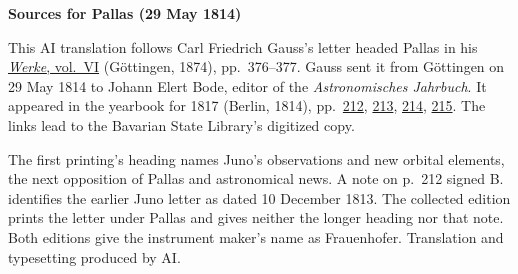 \clearpage\thispagestyle{empty}
\begin{center}\textbf{Sources for Pallas (29 May 1814)}\end{center}
\noindent This AI translation follows Carl Friedrich Gauss’s letter headed Pallas in his \href{https://gdz.sub.uni-goettingen.de/id/PPN236007467}{\textit{Werke}, vol.~VI} (Göttingen, 1874), pp.~376--377. Gauss sent it from Göttingen on 29 May 1814 to Johann Elert Bode, editor of the \textit{Astronomisches Jahrbuch}. It appeared in the yearbook for 1817 (Berlin, 1814), pp.~\href{https://api.digitale-sammlungen.de/iiif/image/v2/bsb10538346_00220/full/1600,/0/default.jpg}{212}, \href{https://api.digitale-sammlungen.de/iiif/image/v2/bsb10538346_00221/full/1600,/0/default.jpg}{213}, \href{https://api.digitale-sammlungen.de/iiif/image/v2/bsb10538346_00222/full/1600,/0/default.jpg}{214}, \href{https://api.digitale-sammlungen.de/iiif/image/v2/bsb10538346_00223/full/1600,/0/default.jpg}{215}. The links lead to the Bavarian State Library’s digitized copy.
\par\smallskip\noindent The first printing’s heading names Juno’s observations and new orbital elements, the next opposition of Pallas and astronomical news. A note on p.~212 signed B. identifies the earlier Juno letter as dated 10 December 1813. The collected edition prints the letter under Pallas and gives neither the longer heading nor that note. Both editions give the instrument maker’s name as Frauenhofer. Translation and typesetting produced by AI.
\clearpage
